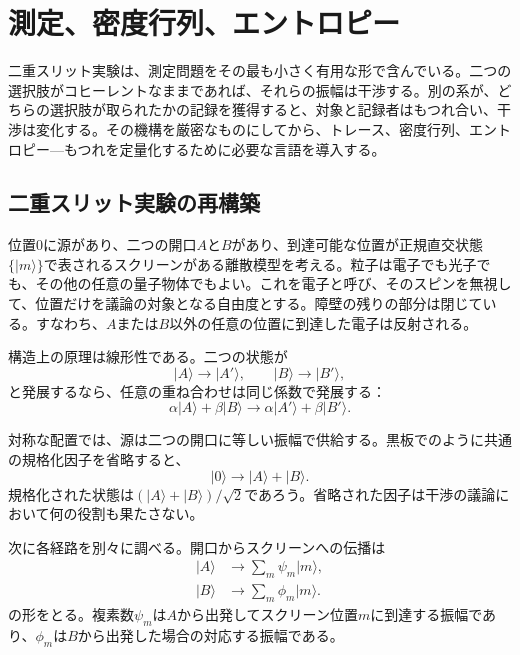 \chapter{測定、密度行列、エントロピー}

二重スリット実験は、測定問題をその最も小さく有用な形で含んでいる。二つの選択肢がコヒーレントなままであれば、それらの振幅は干渉する。別の系が、どちらの選択肢が取られたかの記録を獲得すると、対象と記録者はもつれ合い、干渉は変化する。その機構を厳密なものにしてから、トレース、密度行列、エントロピー---もつれを定量化するために必要な言語を導入する。

\section{二重スリット実験の再構築}

位置\(0\)に源があり、二つの開口\(A\)と\(B\)があり、到達可能な位置が正規直交状態\(\{|m\rangle\}\)で表されるスクリーンがある離散模型を考える。粒子は電子でも光子でも、その他の任意の量子物体でもよい。これを電子と呼び、そのスピンを無視して、位置だけを議論の対象となる自由度とする。障壁の残りの部分は閉じている。すなわち、\(A\)または\(B\)以外の任意の位置に到達した電子は反射される。

構造上の原理は線形性である。二つの状態が
\begin{equation}
|A\rangle\longrightarrow |A'\rangle,
\qquad
|B\rangle\longrightarrow |B'\rangle,
\end{equation}
と発展するなら、任意の重ね合わせは同じ係数で発展する：
\begin{equation}
\alpha|A\rangle+\beta|B\rangle
\longrightarrow
\alpha|A'\rangle+\beta|B'\rangle.
\end{equation}

対称な配置では、源は二つの開口に等しい振幅で供給する。黒板でのように共通の規格化因子を省略すると、
\begin{equation}
|0\rangle\longrightarrow |A\rangle+|B\rangle.
\end{equation}
規格化された状態は\((|A\rangle+|B\rangle)/\sqrt{2}\)であろう。省略された因子は干渉の議論において何の役割も果たさない。

次に各経路を別々に調べる。開口からスクリーンへの伝播は
\begin{align}
|A\rangle &\longrightarrow \sum_m \psi_m|m\rangle, \\
|B\rangle &\longrightarrow \sum_m \phi_m|m\rangle.
\end{align}
の形をとる。複素数\(\psi_m\)は\(A\)から出発してスクリーン位置\(m\)に到達する振幅であり、\(\phi_m\)は\(B\)から出発した場合の対応する振幅である。

